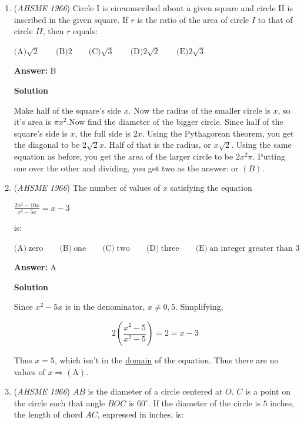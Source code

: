 \begin{enumerate}
	\item (\textit{AHSME 1966}) Circle I is circumscribed about a given square and circle II is inscribed in the given square. If $r$ is the ratio of the area of circle $I$ to that of circle $II$, then $r$ equals:


 $\text{(A)}  \sqrt 2 \qquad \text{(B)}  2 \qquad \text{(C)}  \sqrt 3 \qquad \text{(D)}  2\sqrt 2 \qquad \text{(E)}  2\sqrt 3$

 \textbf{Answer: }B



\textbf{Solution}

Make half of the square's side $x$. Now the radius of the smaller circle is $x$, so it's area is $\pi x^2$.Now find the diameter of the bigger circle. Since half of the square's side is $x$, the full side is $2x$. Using the Pythagorean theorem, you get the diagonal to be $2\sqrt{2}x$. Half of that is the radius, or $x\sqrt{2}$. Using the same equation as before, you get the area of the larger circle to be $2x^2 \pi$. Putting one over the other and dividing, you get two as the answer: or $\boxed{(B)}$.

 


	\item (\textit{AHSME 1966}) The number of values of $x$ satisfying the equation


 $\frac {2x^2 - 10x}{x^2 - 5x} = x - 3$


 is:


 $\text{(A)} \ \text{zero} \qquad \text{(B)} \ \text{one} \qquad \text{(C)} \ \text{two} \qquad \text{(D)} \ \text{three} \qquad \text{(E)} \ \text{an integer greater than 3}$

 \textbf{Answer: }A



\textbf{Solution}

Since $x^2 - 5x$ is in the denominator, $x \neq 0,5$. Simplifying,

 
 \[2\left(\frac{x^2 - 5}{x^2 - 5}\right) = 2 = x-3\]

 Thus $x = 5$, which isn't in the \href{https://artofproblemsolving.com/wiki/index.php?title=Domain}{domain} of the equation. Thus there are no values of $x \Rightarrow \mathrm{(A)}$. 

 


	\item (\textit{AHSME 1966}) $AB$ is the diameter of a circle centered at $O$. $C$ is a point on the circle such that angle $BOC$ is $60^\circ$. If the diameter of the circle is $5$ inches, the length of chord $AC$, expressed in inches, is:



\end{enumerate}
